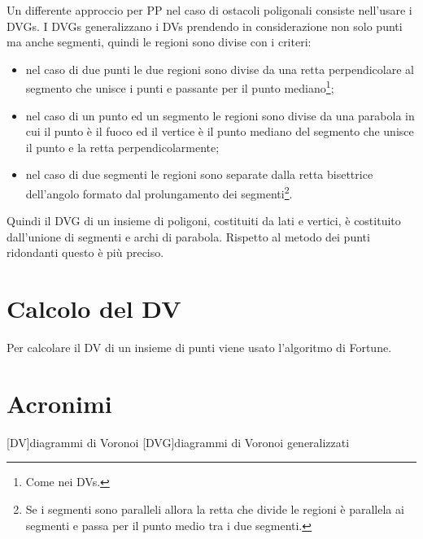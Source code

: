 \documentclass[a4paper,oneside]{article}
\begin{document}
Un differente approccio per \ac{PP} nel caso di ostacoli poligonali
consiste nell'usare i \acp{DVG}. I \acp{DVG} generalizzano i \acp{DV}
prendendo in considerazione non solo punti ma anche segmenti, quindi
le regioni sono divise con i criteri:
\begin{itemize}
\item nel caso di due punti le due regioni sono divise da una retta
  perpendicolare al segmento che unisce i punti e passante per il
  punto mediano\footnote{Come nei \acp{DV}.};
\item nel caso di un punto ed un segmento le regioni sono divise da una
  parabola in cui il punto \`e il fuoco ed il vertice \`e il punto
  mediano del segmento che unisce il punto e la retta
  perpendicolarmente;
\item nel caso di due segmenti le regioni sono separate dalla retta
  bisettrice dell'angolo formato dal prolungamento dei segmenti\footnote{Se i
  segmenti sono paralleli allora la retta che divide le regioni \`e
  parallela ai segmenti e passa per il punto medio tra i due
  segmenti.}.
\end{itemize}
Quindi il \ac{DVG} di un insieme di poligoni, costituiti da lati e
vertici, \`e costituito dall'unione di segmenti e archi di
parabola. Rispetto al metodo dei punti ridondanti questo \`e pi\`u
preciso.
\section{Calcolo del \acl{DV}}
Per calcolare il \ac{DV} di un insieme di punti viene usato
l'algoritmo di Fortune.

\newpage
\section*{Acronimi}
\begin{acronym}[DVG]
\end{acronym}
[DV]{diagrammi di Voronoi}
[DVG]{diagrammi di Voronoi generalizzati}

\nocite{*}
{}
%


\end{document}
